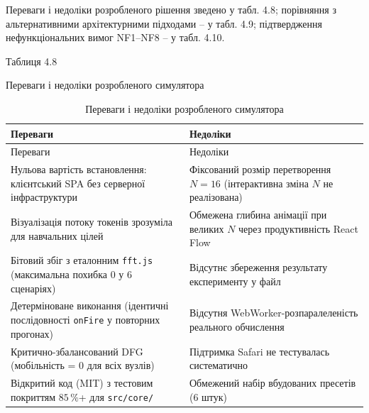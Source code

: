 \documentclass[
]{article}
\newcommand{\passthrough}[1]{#1}
\begin{document}
Переваги і недоліки розробленого рішення зведено у табл. 4.8; порівняння
з альтернативними архітектурними підходами -- у табл. 4.9; підтвердження
нефункціональних вимог NF1--NF8 -- у табл. 4.10.

Таблиця 4.8

Переваги і недоліки розробленого симулятора

\begin{longtable}[]{@{}
  >{\raggedright\arraybackslash}p{}
  >{\raggedright\arraybackslash}p{}@{}}
\caption[Переваги і недоліки розробленого симулятора]{Переваги і
недоліки розробленого симулятора}\tabularnewline
\toprule\noalign{}
\begin{minipage}[b]{\linewidth}\raggedright
Переваги
\end{minipage} & \begin{minipage}[b]{\linewidth}\raggedright
Недоліки
\end{minipage} \\
\midrule\noalign{}
\endfirsthead
\toprule\noalign{}
\begin{minipage}[b]{\linewidth}\raggedright
Переваги
\end{minipage} & \begin{minipage}[b]{\linewidth}\raggedright
Недоліки
\end{minipage} \\
\midrule\noalign{}
\endhead
\bottomrule\noalign{}
\endlastfoot
Нульова вартість встановлення: клієнтський SPA без серверної
інфраструктури & Фіксований розмір перетворення \(N = 16\) (інтерактивна
зміна \(N\) не реалізована) \\
Візуалізація потоку токенів зрозуміла для навчальних цілей & Обмежена
глибина анімації при великих \(N\) через продуктивність React Flow \\
Бітовий збіг з еталонним
\passthrough{\lstinline!fft!}\passthrough{\lstinline!.!}\passthrough{\lstinline!js!}
(максимальна похибка \(0\) у 6 сценаріях) & Відсутнє збереження
результату експерименту у файл \\
Детерміноване виконання (ідентичні послідовності
\passthrough{\lstinline!onFire!} у повторних прогонах) & Відсутня
WebWorker-розпаралеленість реального обчислення \\
Критично-збалансований DFG (мобільність = 0 для всіх вузлів) & Підтримка
Safari не тестувалась систематично \\
Відкритий код (MIT) з тестовим покриттям \(85\,\%\)+ для
\passthrough{\lstinline!src!}\passthrough{\lstinline!/!}\passthrough{\lstinline!core!}\passthrough{\lstinline!/!}
& Обмежений набір вбудованих пресетів (6 штук) \\
\end{longtable}
\end{document}
